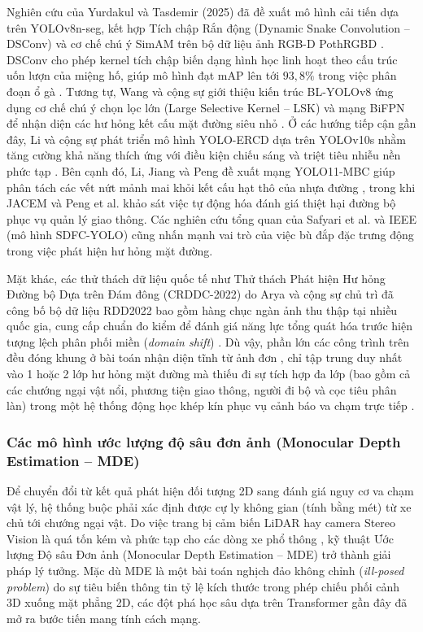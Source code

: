\documentclass[12pt,a4paper]{article}
\begin{document}
Nghiên cứu của Yurdakul và Tasdemir (2025) đã đề xuất mô hình cải tiến dựa trên YOLOv8n-seg, kết hợp Tích chập Rắn động (Dynamic Snake Convolution -- DSConv) và cơ chế chú ý SimAM trên bộ dữ liệu ảnh RGB-D PothRGBD \cite{6}. DSConv cho phép kernel tích chập biến dạng hình học linh hoạt theo cấu trúc uốn lượn của miệng hố, giúp mô hình đạt mAP lên tới $93,8\%$ trong việc phân đoạn ổ gà \cite{6}. Tương tự, Wang và cộng sự giới thiệu kiến trúc BL-YOLOv8 ứng dụng cơ chế chú ý chọn lọc lớn (Large Selective Kernel -- LSK) và mạng BiFPN để nhận diện các hư hỏng kết cấu mặt đường siêu nhỏ \cite{8}. Ở các hướng tiếp cận gần đây, Li và cộng sự phát triển mô hình YOLO-ERCD dựa trên YOLOv10s nhằm tăng cường khả năng thích ứng với điều kiện chiếu sáng và triệt tiêu nhiễu nền phức tạp \cite{9}. Bên cạnh đó, Li, Jiang và Peng đề xuất mạng YOLO11-MBC giúp phân tách các vết nứt mảnh mai khỏi kết cấu hạt thô của nhựa đường \cite{10}, trong khi JACEM \cite{7} và Peng et al. \cite{12} khảo sát việc tự động hóa đánh giá thiệt hại đường bộ phục vụ quản lý giao thông. Các nghiên cứu tổng quan của Safyari et al. \cite{11} và IEEE \cite{29} (mô hình SDFC-YOLO) cũng nhấn mạnh vai trò của việc bù đắp đặc trưng động trong việc phát hiện hư hỏng mặt đường.

Mặt khác, các thử thách dữ liệu quốc tế như Thử thách Phát hiện Hư hỏng Đường bộ Dựa trên Đám đông (CRDDC-2022) do Arya và cộng sự chủ trì đã công bố bộ dữ liệu RDD2022 bao gồm hàng chục ngàn ảnh thu thập tại nhiều quốc gia, cung cấp chuẩn đo kiểm để đánh giá năng lực tổng quát hóa trước hiện tượng lệch phân phối miền (\textit{domain shift}) \cite{13}. Dù vậy, phần lớn các công trình trên đều đóng khung ở bài toán nhận diện tĩnh từ ảnh đơn \cite{14, 15}, chỉ tập trung duy nhất vào 1 hoặc 2 lớp hư hỏng mặt đường mà thiếu đi sự tích hợp đa lớp (bao gồm cả các chướng ngại vật nổi, phương tiện giao thông, người đi bộ và cọc tiêu phân làn) trong một hệ thống động học khép kín phục vụ cảnh báo va chạm trực tiếp \cite{16}.

\subsubsection{Các mô hình ước lượng độ sâu đơn ảnh (Monocular Depth Estimation -- MDE)}
Để chuyển đổi từ kết quả phát hiện đối tượng 2D sang đánh giá nguy cơ va chạm vật lý, hệ thống buộc phải xác định được cự ly không gian (tính bằng mét) từ xe chủ tới chướng ngại vật. Do việc trang bị cảm biến LiDAR hay camera Stereo Vision là quá tốn kém và phức tạp cho các dòng xe phổ thông \cite{27}, kỹ thuật Ước lượng Độ sâu Đơn ảnh (Monocular Depth Estimation -- MDE) trở thành giải pháp lý tưởng. Mặc dù MDE là một bài toán nghịch đảo không chỉnh (\textit{ill-posed problem}) do sự tiêu biến thông tin tỷ lệ kích thước trong phép chiếu phối cảnh 3D xuống mặt phẳng 2D, các đột phá học sâu dựa trên Transformer gần đây đã mở ra bước tiến mang tính cách mạng.
\end{document}
